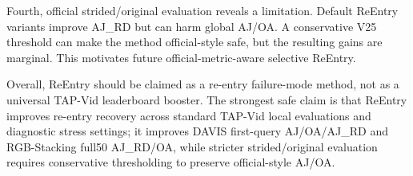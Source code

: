 Fourth, official strided/original evaluation reveals a limitation. Default ReEntry variants improve AJ\_RD but can harm global AJ/OA. A conservative V25 threshold can make the method official-style safe, but the resulting gains are marginal. This motivates future official-metric-aware selective ReEntry.

Overall, ReEntry should be claimed as a re-entry failure-mode method, not as a universal TAP-Vid leaderboard booster. The strongest safe claim is that ReEntry improves re-entry recovery across standard TAP-Vid local evaluations and diagnostic stress settings; it improves DAVIS first-query AJ/OA/AJ\_RD and RGB-Stacking full50 AJ\_RD/OA, while stricter strided/original evaluation requires conservative thresholding to preserve official-style AJ/OA.
